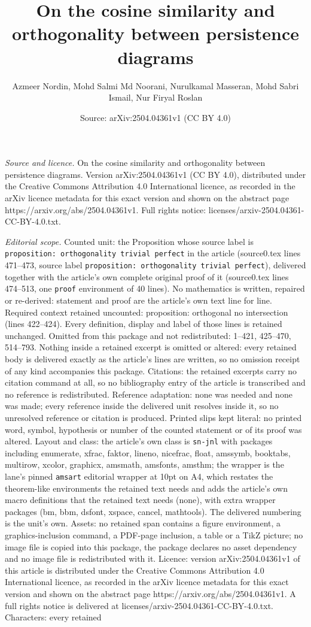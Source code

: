 \documentclass[10pt,a4paper]{amsart}
\title[On the cosine similarity and orthogonality between persisten]{On the cosine similarity and orthogonality between persistence diagrams}
\author{Azmeer Nordin, Mohd Salmi Md Noorani, Nurulkamal Masseran, Mohd Sabri Ismail, Nur Firyal Roslan}
\date{Source: arXiv:2504.04361v1 (CC BY 4.0)}
\begin{document}
\maketitle

\noindent\emph{Source and licence.} On the cosine similarity and orthogonality between persistence diagrams. Version arXiv:2504.04361v1 (CC BY 4.0), distributed under the Creative Commons Attribution 4.0 International licence, as recorded in the arXiv licence metadata for this exact version and shown on the abstract page https://arxiv.org/abs/2504.04361v1. Full rights notice: licenses/arxiv-2504.04361-CC-BY-4.0.txt.\par\smallskip

\noindent\textit{Editorial scope.} Counted unit: the Proposition whose source label is \texttt{proposition: orthogonality trivial perfect} in the article (source0.tex lines 471--473, source label \texttt{proposition: orthogonality trivial perfect}), delivered together with the article's own complete original proof of it (source0.tex lines 474--513, one \texttt{proof} environment of 40 lines). No mathematics is written, repaired or re-derived: statement and proof are the article's own text line for line. Required context retained uncounted: proposition: orthogonal no intersection (lines 422--424). Every definition, display and label of those lines is retained unchanged. Omitted from this package and not redistributed: 1--421, 425--470, 514--793. Nothing inside a retained excerpt is omitted or altered: every retained body is delivered exactly as the article's lines are written, so no omission receipt of any kind accompanies this package. Citations: the retained excerpts carry no citation command at all, so no bibliography entry of the article is transcribed and no reference is redistributed. Reference adaptation: none was needed and none was made; every reference inside the delivered unit resolves inside it, so no unresolved reference or citation is produced. Printed slips kept literal: no printed word, symbol, hypothesis or number of the counted statement or of its proof was altered. Layout and class: the article's own class is \texttt{sn-jnl} with packages including enumerate, xfrac, faktor, lineno, nicefrac, float, amssymb, booktabs, multirow, xcolor, graphicx, amsmath, amsfonts, amsthm; the wrapper is the lane's pinned \texttt{amsart} editorial wrapper at 10pt on A4, which restates the theorem-like environments the retained text needs and adds the article's own macro definitions that the retained text needs (none), with extra wrapper packages (bm, bbm, dsfont, xspace, cancel, mathtools). The delivered numbering is the unit's own. Assets: no retained span contains a figure environment, a graphics-inclusion command, a PDF-page inclusion, a table or a TikZ picture; no image file is copied into this package, the package declares no asset dependency and no image file is redistributed with it. Licence: version arXiv:2504.04361v1 of this article is distributed under the Creative Commons Attribution 4.0 International licence, as recorded in the arXiv licence metadata for this exact version and shown on the abstract page https://arxiv.org/abs/2504.04361v1. A full rights notice is delivered at licenses/arxiv-2504.04361-CC-BY-4.0.txt. Characters: every retained 
\end{document}
